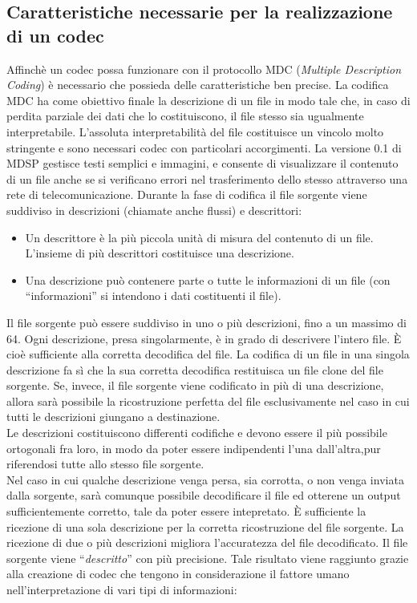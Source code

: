 \subsection{Caratteristiche necessarie per la realizzazione di un codec}
Affinch\`e un codec possa funzionare con il protocollo MDC (\emph{Multiple Description Coding}) è necessario che possieda delle caratteristiche ben precise. La codifica MDC ha come obiettivo finale la descrizione di un file in modo tale che, in caso di perdita parziale dei dati che lo costituiscono, il file stesso sia ugualmente interpretabile. L'assoluta interpretabilit\`a del file costituisce un vincolo molto stringente e sono necessari codec con particolari accorgimenti. La versione 0.1 di MDSP gestisce testi semplici e immagini, e consente di visualizzare il contenuto di un file anche se si verificano errori nel trasferimento dello stesso attraverso una rete di telecomunicazione. Durante la fase di codifica il file sorgente viene suddiviso in descrizioni (chiamate anche flussi) e descrittori:
\begin{itemize}
 \item Un descrittore \`e la pi\`u piccola unit\`a di misura del contenuto di un file. L'insieme di pi\`u descrittori costituisce una descrizione.
 \item Una descrizione pu\`o contenere parte o tutte le informazioni di un file (con ``informazioni'' si intendono i dati costituenti il file).
\end{itemize}
Il file sorgente pu\`o essere suddiviso in uno o pi\`u descrizioni, fino a un massimo di 64. Ogni descrizione, presa singolarmente, \`e in grado di descrivere l'intero file. \`E cio\`e sufficiente alla corretta decodifica del file. La codifica di un file in una singola descrizione fa s\`i che la sua corretta decodifica restituisca un file clone del file sorgente. Se, invece, il file sorgente viene codificato in pi\`u di una descrizione, allora sarà possibile la ricostruzione perfetta del file esclusivamente nel caso in cui tutti le descrizioni giungano a destinazione.
\\
Le descrizioni costituiscono differenti codifiche e devono essere il più possibile ortogonali fra loro, in modo da poter essere indipendenti l'una dall'altra,pur riferendosi tutte allo stesso file sorgente.
\\
Nel caso in cui qualche descrizione venga persa, sia corrotta, o non venga inviata dalla sorgente, sarà comunque possibile decodificare il file ed otterene un output sufficientemente corretto, tale da poter essere intepretato. \`E sufficiente la ricezione di una sola descrizione per la corretta ricostruzione del file sorgente. La ricezione di due o pi\`u descrizioni migliora l'accuratezza del file decodificato. Il file sorgente viene ``\emph{descritto}'' con pi\`u precisione.  Tale risultato viene raggiunto grazie alla creazione di codec che tengono in considerazione il fattore umano nell'interpretazione di vari tipi di informazioni:
